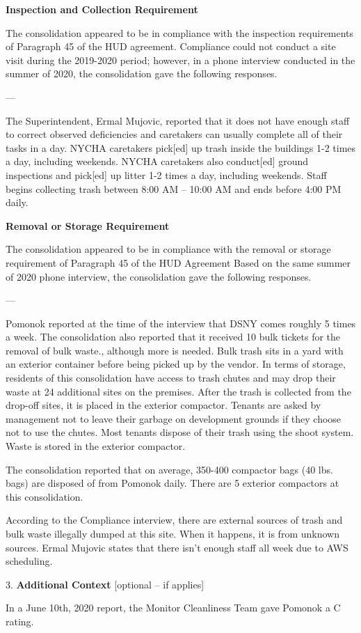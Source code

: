 
\textbf{Inspection and Collection Requirement}

The consolidation appeared to be in compliance with the inspection requirements of Paragraph 45 of the HUD agreement. Compliance could not conduct a site visit during the 2019-2020 period; however, in a phone interview conducted in the summer of 2020, the consolidation gave the following responses.

---

The Superintendent, Ermal Mujovic, reported that it does not have enough staff to correct observed deficiencies and caretakers can usually complete all of their tasks in a day. NYCHA caretakers pick[ed] up trash inside the buildings 1-2 times a day, including weekends. NYCHA caretakers also conduct[ed] ground inspections and pick[ed] up litter 1-2 times a day, including weekends. Staff begins collecting trash between 8:00 AM -- 10:00 AM and ends before 4:00 PM daily.

\textbf{Removal or Storage Requirement}

The consolidation appeared to be in compliance with the  removal or storage requirement of Paragraph  45 of the HUD  Agreement Based on the same summer of  2020 phone interview, the consolidation gave the following responses.

---

Pomonok reported at the time of the interview that DSNY comes roughly 5 times a week. The consolidation also reported that it received 10 bulk tickets for the removal of bulk waste., although more is needed. Bulk trash sits in a yard with an exterior container before being picked up by the vendor. In terms of storage, residents of this consolidation have access to trash chutes and may drop their waste at 24 additional sites on the premises. After the trash is collected from the drop-off sites, it is placed in the exterior compactor. Tenants are asked by management not to leave their garbage on development grounds if they choose not to use the chutes. Most tenants dispose of their trash using the shoot system. Waste is stored in the exterior compactor. 

The consolidation reported that on average, 350-400 compactor bags (40 lbs. bags) are disposed of from Pomonok daily. There are 5 exterior compactors at this consolidation. 

According to the Compliance interview, there are external sources of trash and bulk waste illegally dumped at this site. When it happens, it is from unknown sources. Ermal Mujovic states that there isn't enough staff all week due to AWS scheduling. 

3. \textbf{Additional Context} [optional -- if applies]

In a June 10th, 2020 report, the Monitor Cleanliness Team gave Pomonok a C rating. 